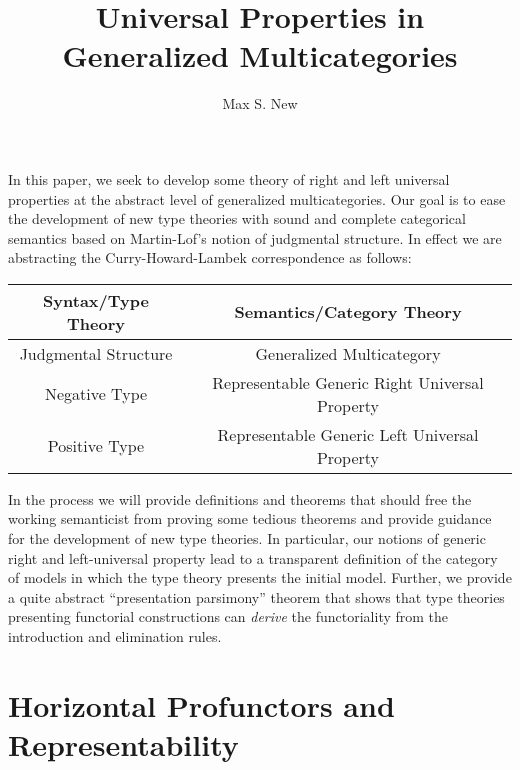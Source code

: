 \documentclass{article}
\begin{document}
\newtheorem{theorem}{Theorem}
\newtheorem{definition}{Definition}
\newcommand{\pto}{\nrightarrow}
\newcommand{\pfrom}{\nleftarrow}
\newcommand{\vcat}{\mathcal}
\newcommand{\cat}{\mathbb}
\newcommand{\vtkmnd}{\mathbb{K}\text{Mod}(\vcat{V},T)}
\newcommand{\rmod}{\text{RMod}}

\title{Universal Properties in Generalized Multicategories}
\author{Max S. New}

\maketitle

In this paper, we seek to develop some theory of right and left
universal properties at the abstract level of generalized
multicategories.
%
Our goal is to ease the development of new type theories with sound
and complete categorical semantics based on Martin-Lof's notion of
judgmental structure.
%
In effect we are abstracting the Curry-Howard-Lambek correspondence as
follows:

\begin{tabular}{|c|c|}
  \hline
  Syntax/Type Theory & Semantics/Category Theory\\ \hline \hline
  Judgmental Structure & Generalized Multicategory\\ \hline
  Negative Type & Representable Generic Right Universal Property\\ \hline
  Positive Type & Representable Generic Left Universal Property\\ \hline  
\end{tabular}

In the process we will provide definitions and theorems that should
free the working semanticist from proving some tedious theorems and
provide guidance for the development of new type theories.
%
In particular, our notions of generic right and left-universal
property lead to a transparent definition of the category of models in
which the type theory presents the initial model.
Further, we provide a quite abstract ``presentation parsimony''
theorem that shows that type theories presenting functorial
constructions can \emph{derive} the functoriality from the
introduction and elimination rules.

\section{Horizontal Profunctors and Representability}
\end{document}
